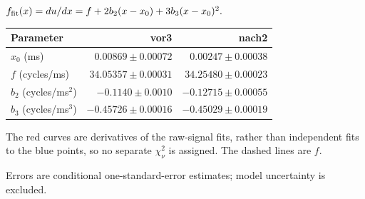 \par\smallskip\begingroup\small
\setlength{\tabcolsep}{5pt}
\(f_{\rm fit}(x)=du/dx=f+2b_2(x-x_0)+3b_3(x-x_0)^2.\)
\par\smallskip\begin{tabular}{lrr}\toprule
Parameter & vor3 & nach2\\\midrule
$x_0$ (ms) & $0.00869\pm0.00072$ & $0.00247\pm0.00038$\\
$f$ (cycles/ms) & $34.05357\pm0.00031$ & $34.25480\pm0.00023$\\
$b_2$ (cycles/ms$^2$) & $-0.1140\pm0.0010$ & $-0.12715\pm0.00055$\\
$b_3$ (cycles/ms$^3$) & $-0.45726\pm0.00016$ & $-0.45029\pm0.00019$\\
\bottomrule\end{tabular}
\par\smallskip\noindent The red curves are derivatives of the raw-signal fits, rather than independent fits to the blue points, so no separate $\chi^2_\nu$ is assigned. The dashed lines are $f$.
\par\smallskip\noindent Errors are conditional one-standard-error estimates; model uncertainty is excluded.
\par\endgroup
